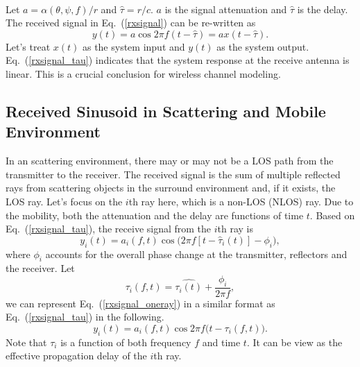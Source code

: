 \documentclass[letterpaper,11pt]{article}
\begin{document}
~\\

Let $a=\alpha(\theta, \psi, f)/r$ and $\hat{\tau}=r/c$. $a$ is the signal attenuation and $\hat{\tau}$ is the delay. The received signal in Eq.~(\ref{rxsignal}) can be re-written as
\begin{equation}\label{rxsignal_tau}
y(t)=a\cos2\pi f(t-\hat{\tau})=ax(t-\hat{\tau}).
\end{equation}
Let's treat $x(t)$ as the system input and $y(t)$ as the system output. Eq.~(\ref{rxsignal_tau}) indicates that the system response at the receive antenna is linear. This is a crucial conclusion for wireless channel modeling. \\



\subsection{Received Sinusoid in Scattering and Mobile Environment}

In an scattering environment, there may or may not be a LOS path from the transmitter to the receiver. The received signal is the sum of multiple reflected rays from scattering objects in the surround environment and, if it exists, the LOS ray. Let's focus on the $i$th ray here, which is a non-LOS (NLOS) ray. Due to the mobility, both the attenuation and the delay are functions of time $t$. Based on Eq.~(\ref{rxsignal_tau}), the receive signal from the $i$th ray is
\begin{equation}\label{rxsignal_oneray}
\displaystyle y_i(t)=a_i(f,t)\cos\big(2\pi f[t-\hat{\tau}_i(t)]-\phi_i\big),
\end{equation}
where $\phi_i$ accounts for the overall phase change at the transmitter, reflectors and the receiver. Let
$$
\tau_i(f, t)=\hat{\tau_i(t)}+\frac{\phi_i}{2\pi f},
$$ 
we can represent Eq.~(\ref{rxsignal_oneray}) in a similar format as Eq.~(\ref{rxsignal_tau}) in the following.
\begin{equation}
y_i(t)=a_i(f,t)\cos2\pi f\big(t-\tau_i(f, t)\big).
\end{equation}
Note that $\tau_i$ is a function of both frequency $f$ and time $t$. It can be view as the effective propagation delay of the $i$th ray.
\end{document}
